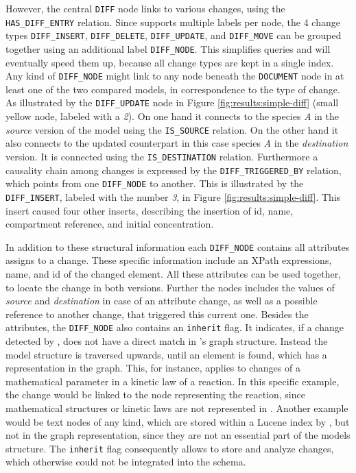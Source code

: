 However, the central \texttt{DIFF} node links to various changes, using the \texttt{HAS\_DIFF\_ENTRY} relation. Since \neoj supports multiple labels per node, the 4 change types \texttt{DIFF\_INSERT}, \texttt{DIFF\_DELETE}, \texttt{DIFF\_UPDATE}, and \texttt{DIFF\_MOVE} can be grouped together using an additional label \texttt{DIFF\_NODE}. This simplifies queries and will eventually speed them up, because all change types are kept in a single index.
Any kind of \texttt{DIFF\_NODE} might link to any node beneath the \texttt{DOCUMENT} node in at least one of the two compared models, in correspondence to the type of change.
As illustrated by the \texttt{DIFF\_UPDATE} node in Figure \ref{fig:results:simple-diff} (small yellow node, labeled with a \emph{2}). On one hand it connects to the species \emph{A} in the \emph{source} version of the model using the \texttt{IS\_SOURCE} relation. On the other hand it also connects to the updated counterpart in this case species \emph{A} in the \emph{destination} version. It is connected using the \texttt{IS\_DESTINATION} relation.
Furthermore a causality chain among changes is expressed by the \texttt{DIFF\_TRIGGERED\_BY} relation, which points from one \texttt{DIFF\_NODE} to another. This is illustrated by the \texttt{DIFF\_INSERT}, labeled with the number \emph{3}, in Figure \ref{fig:results:simple-diff}. This insert caused four other inserts, describing the insertion of id, name, compartment reference, and initial concentration.

In addition to these structural information each \texttt{DIFF\_NODE} contains all attributes \bives assigns to a change. These \bives specific information include an XPath expressions, name, and id of the changed \xml element. All these attributes can be used together, to locate the change in both versions.
Further the nodes includes the values of \emph{source} and \emph{destination} in case of an attribute change, as well as a possible reference to another change, that triggered this current one.
Besides the \bives attributes, the \texttt{DIFF\_NODE} also contains an \texttt{inherit} flag. It indicates, if a change detected by \bives, does not have a direct match in \masymos's graph structure. Instead the model structure is traversed upwards, until an element is found, which has a representation in the \masymos graph.
This, for instance, applies to changes of a mathematical parameter in a kinetic law of a reaction. In this specific example, the change would be linked to the node representing the reaction, since mathematical structures or kinetic laws are not represented in \masymos. Another example would be text nodes of any kind, which are stored within a Lucene index by \masymos, but not in the graph representation, since they are not an essential part of the models structure.
The \texttt{inherit} flag consequently allows to store and analyze changes, which otherwise could not be integrated into the schema.

